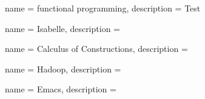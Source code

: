  
{name = functional programming,
description = {Test %
}}

{name = Isabelle,
description = {%
}}

{name = Calculus of Constructions,
description = {%
}}

{name = Hadoop,
description = {%
}}

{name = Emacs,
description = {%
}}







